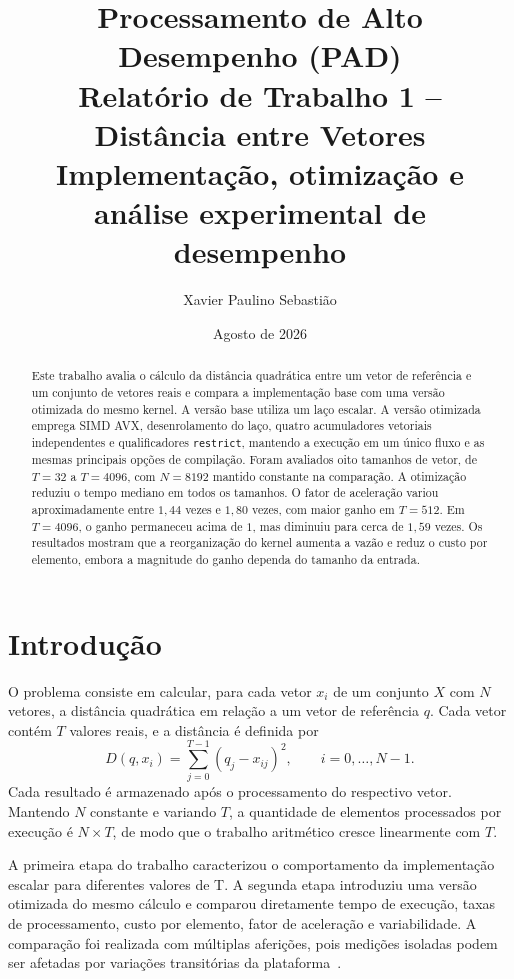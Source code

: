 \documentclass[11pt,a4paper]{article}
\title{
    \textbf{Processamento de Alto Desempenho (PAD)}\\[0.8em]
    \large Relatório de Trabalho 1 -- Distância entre Vetores\\[0.35em]
    \normalsize Implementação, otimização e análise experimental de desempenho
}
\author{Xavier Paulino Sebastião}
\date{Agosto de 2026}
\begin{document}
\maketitle

\begin{abstract}
Este trabalho avalia o cálculo da distância quadrática entre um vetor de referência e um conjunto de vetores reais e compara a implementação base com uma versão otimizada do mesmo kernel. A versão base utiliza um laço escalar. A versão otimizada emprega SIMD AVX, desenrolamento do laço, quatro acumuladores vetoriais independentes e qualificadores \texttt{restrict}, mantendo a execução em um único fluxo e as mesmas principais opções de compilação. Foram avaliados oito tamanhos de vetor, de $T=32$ a $T=4096$, com $N=8192$ mantido constante na comparação. A otimização reduziu o tempo mediano em todos os tamanhos. O fator de aceleração variou aproximadamente entre $1{,}44$ vezes e $1{,}80$ vezes, com maior ganho em $T=512$. Em $T=4096$, o ganho permaneceu acima de $1$, mas diminuiu para cerca de $1{,}59$ vezes. Os resultados mostram que a reorganização do kernel aumenta a vazão e reduz o custo por elemento, embora a magnitude do ganho dependa do tamanho da entrada.
\end{abstract}

\section{Introdução}
O problema consiste em calcular, para cada vetor $x_i$ de um conjunto $X$ com $N$ vetores, a distância quadrática em relação a um vetor de referência $q$. Cada vetor contém $T$ valores reais, e a distância é definida por
\begin{equation}
D(q,x_i)=\sum_{j=0}^{T-1}(q_j-x_{ij})^2,
\qquad i=0,\ldots,N-1.
\end{equation}
Cada resultado é armazenado após o processamento do respectivo vetor. Mantendo $N$ constante e variando $T$, a quantidade de elementos processados por execução é $N\times T$, de modo que o trabalho aritmético cresce linearmente com $T$.

A primeira etapa do trabalho caracterizou o comportamento da implementação escalar para diferentes valores de T. A segunda etapa introduziu uma versão otimizada do mesmo cálculo e comparou diretamente tempo de execução, taxas de processamento, custo por elemento, fator de aceleração e variabilidade. A comparação foi realizada com múltiplas aferições, pois medições isoladas podem ser afetadas por variações transitórias da plataforma~\cite{hoefler2015,curtsinger2013,kalibera2013rigorous}.
\end{document}

